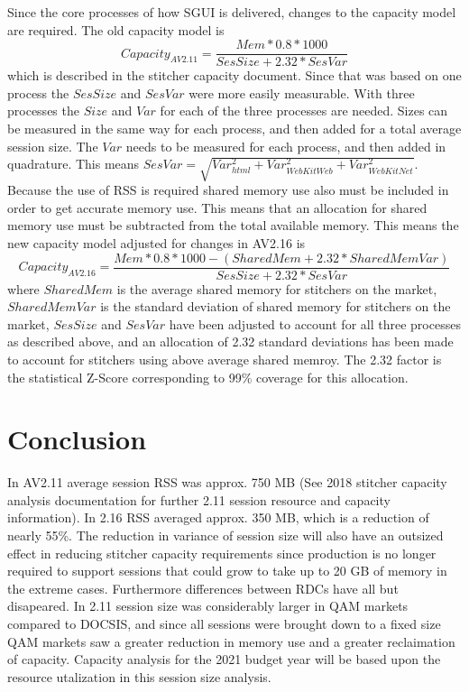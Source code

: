 \documentclass{article}
\begin{document}
Since the core processes of how SGUI is delivered, changes to the capacity model are required. The old capacity model is $$Capacity_{AV2.11}=\frac{Mem * 0.8 * 1000}{SesSize + 2.32*SesVar}$$ which is described in the stitcher capacity document. Since that was based on one process the $SesSize$ and $SesVar$ were more easily measurable. With three processes the $Size$ and $Var$ for each of the three processes are needed. Sizes can be measured in the same way for each process, and then added for a total average session size. The $Var$ needs to be measured for each process, and then added in quadrature. This means $SesVar=\sqrt{Var_{html}^2 + Var_{WebKitWeb}^2 + Var_{WebKitNet}^2}$. Because the use of RSS is required shared memory use also must be included in order to get accurate memory use. This means that an allocation for shared memory use must be subtracted from the total available memory. This means the new capacity model adjusted for changes in AV2.16 is $$Capacity_{AV2.16}=\frac{Mem * 0.8 * 1000 - (SharedMem + 2.32*SharedMemVar)}{SesSize + 2.32*SesVar}$$ where $SharedMem$ is the average shared memory for stitchers on the market, $SharedMemVar$ is the standard deviation of shared memory for stitchers on the market, $SesSize$ and $SesVar$ have been adjusted to account for all three processes as described above, and an allocation of 2.32 standard deviations has been made to account for stitchers using above average shared memroy. The 2.32 factor is the statistical Z-Score corresponding to 99\% coverage for this allocation.



\section{Conclusion}
\label{SECTION-Conclusion}

In AV2.11 average session RSS was approx. 750 MB (See 2018 stitcher capacity analysis documentation for further 2.11 session resource and capacity information). In 2.16 RSS averaged approx. 350 MB, which is a reduction of nearly 55\%. The reduction in variance of session size will also have an outsized effect in reducing stitcher capacity requirements since production is no longer required to support sessions that could grow to take up to 20 GB of memory in the extreme cases. Furthermore differences between RDCs have all but disapeared. In 2.11 session size was considerably larger in QAM markets compared to DOCSIS, and since all sessions were brought down to a fixed size QAM markets saw a greater reduction in memory use and a greater reclaimation of capacity. Capacity analysis for the 2021 budget year will be based upon the resource utalization in this session size analysis. 
\end{document}
